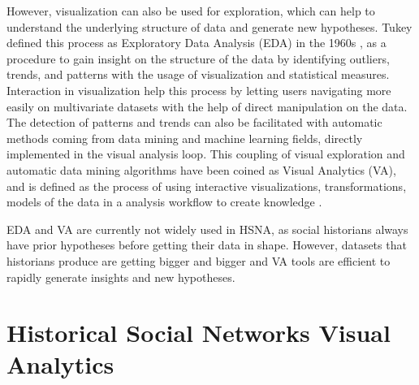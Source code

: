 However, visualization can also be used for exploration, which can help to understand the underlying structure of data and generate new hypotheses.
Tukey defined this process as Exploratory Data Analysis (EDA) in the 1960s \cite{tukeyExploratoryDataAnalysis1977}, as a procedure to gain insight on the structure of the data by identifying outliers, trends, and patterns with the usage of visualization and statistical measures.
Interaction in visualization help this process by letting users navigating more easily on multivariate datasets with the help of direct manipulation on the data.
The detection of patterns and trends can also be facilitated with automatic methods coming from data mining and machine learning fields, directly implemented in the visual analysis loop.
This coupling of visual exploration and automatic data mining algorithms have been coined as Visual Analytics (VA), and is defined as the process of using interactive visualizations, transformations, models of the data in a analysis workflow to create knowledge \cite{keimVisualAnalyticsDefinition2008}.

EDA and VA are currently not widely used in HSNA, as social historians always have prior hypotheses before getting their data in shape.
However, datasets that historians produce are getting bigger and bigger and VA tools are efficient to rapidly generate insights and new hypotheses.


\section{Historical Social Networks Visual Analytics}\label{sec:historical-social-networks-visual-analytics}

